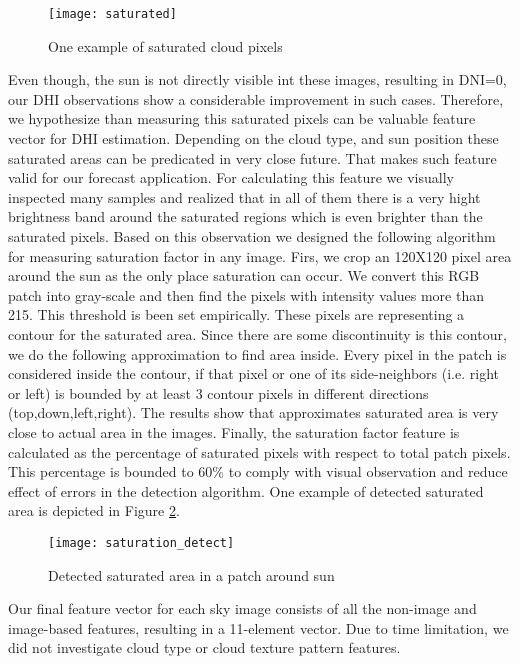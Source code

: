 \begin{figure}[h]
\caption{One example of saturated cloud pixels}
\label{fig:saturated_example}
\texttt{[image: saturated]}
\centering
\end{figure}

Even though, the sun is not directly visible int these images, resulting in DNI=0, our DHI observations show a considerable improvement in such cases. Therefore, we hypothesize than measuring this saturated pixels can be valuable feature vector for DHI estimation. Depending on the cloud type, and sun position these saturated areas can be predicated in very close future. That makes such feature valid for our forecast application. For calculating this feature we visually inspected many samples and realized that in all of them there is a very hight brightness band around the saturated regions which is even brighter than the saturated pixels. Based on this observation we designed the following algorithm for measuring saturation factor in any image. Firs, we crop an 120X120 pixel area around the sun as the only place saturation can occur. We convert this RGB patch into gray-scale and then find the pixels with intensity values more than 215. This threshold is been set empirically. These pixels are representing a contour for the saturated area. Since there are some discontinuity is this contour, we do the following approximation to find area inside. Every pixel in the patch is considered inside the contour, if that pixel or one of its side-neighbors (i.e. right or left) is bounded by at least 3 contour pixels in different directions (top,down,left,right). The results show that approximates saturated area is very close to actual area in the images. Finally, the saturation factor feature is calculated as the percentage of saturated pixels with respect to total patch pixels. This percentage is bounded to 60\% to comply with visual observation and reduce effect of errors in the detection algorithm. One example of detected saturated area is depicted in Figure \ref{fig:saturated_result_example}.

\begin{figure}[h]
\caption{Detected saturated area in a patch around sun}
\label{fig:saturated_result_example}
\texttt{[image: saturation\_detect]}
\centering
\end{figure}

Our final feature vector for each sky image consists of all the non-image and image-based features, resulting in a 11-element vector. Due to time limitation, we did not investigate cloud type or cloud texture pattern features.


